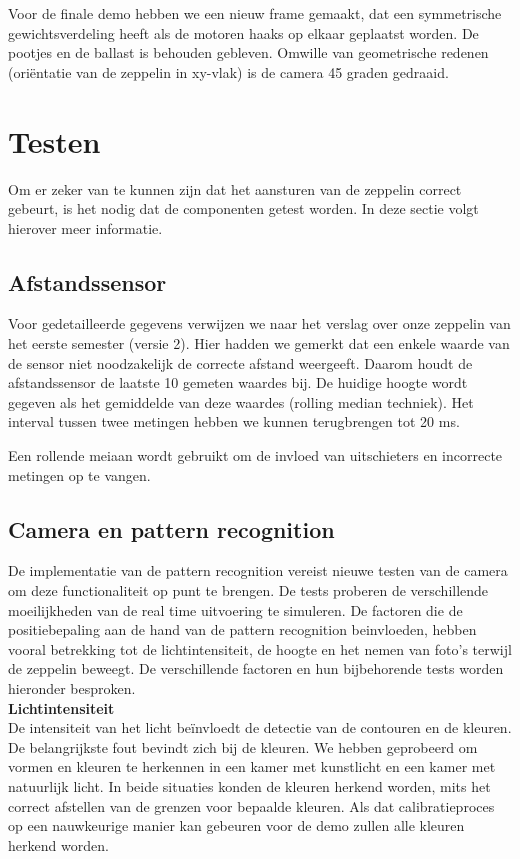 \documentclass[eind]{penoverslag}
\begin{document}
Voor de finale demo hebben we een nieuw frame gemaakt, dat een symmetrische gewichtsverdeling heeft als de motoren haaks op elkaar geplaatst worden. De pootjes en de ballast is behouden gebleven. Omwille van geometrische redenen (ori\"entatie van de zeppelin in xy-vlak) is de camera 45 graden gedraaid. \\

\section{Testen}

Om er zeker van te kunnen zijn dat het aansturen van de zeppelin correct gebeurt, is het nodig dat de componenten getest worden. In deze sectie volgt hierover meer informatie.

\subsection{Afstandssensor}
Voor gedetailleerde gegevens verwijzen we naar het verslag over onze zeppelin van het eerste semester (versie 2). Hier hadden we gemerkt dat een enkele waarde van de sensor niet noodzakelijk de correcte afstand weergeeft. Daarom houdt de afstandssensor de laatste 10 gemeten waardes bij. De huidige hoogte wordt gegeven als het gemiddelde van deze waardes (rolling median techniek). Het interval tussen twee metingen hebben we kunnen terugbrengen tot 20 ms.

Een rollende meiaan wordt gebruikt om de invloed van uitschieters en incorrecte metingen op te vangen. \\

\subsection{Camera en pattern recognition}
De implementatie van de pattern recognition vereist nieuwe testen van de camera om deze functionaliteit op punt te brengen. De tests proberen de verschillende moeilijkheden van de real time uitvoering te simuleren. De factoren die de positiebepaling aan de hand van de pattern recognition beinvloeden, hebben vooral betrekking tot de lichtintensiteit, de hoogte en het nemen van foto’s terwijl de zeppelin beweegt. De verschillende factoren en hun bijbehorende tests worden hieronder besproken.
\\
\textbf{Lichtintensiteit}\\
De intensiteit van het licht be\"{i}nvloedt de detectie van de contouren en de kleuren. De belangrijkste fout bevindt zich bij de kleuren. We hebben geprobeerd om vormen en kleuren te herkennen in een kamer met kunstlicht en een kamer met natuurlijk licht. In beide situaties konden de kleuren herkend worden, mits het correct afstellen van de grenzen voor bepaalde kleuren. Als dat calibratieproces op een nauwkeurige manier kan gebeuren voor de demo zullen alle kleuren herkend worden.\\
\end{document}
